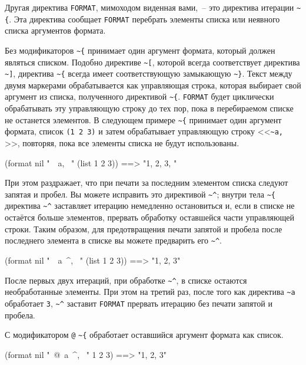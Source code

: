Другая директива \lstinline{FORMAT}, мимоходом виденная вами,~-- это директива итерации
\lstinline!~{!. Эта директива сообщает \lstinline{FORMAT} перебрать элементы списка или
  неявного списка аргументов формата.

Без модификаторов \lstinline!~{! принимает один аргумент формата, который должен являться списком. Подобно директиве
\lstinline!~[!, которой всегда соответствует директива \lstinline!~]!, директива \lstinline!~{! всегда имеет соответствующую замыкающую
\lstinline!~}!. Текст между двумя маркерами обрабатывается как управляющая строка, которая выбирает свой аргумент из
списка, полученного  директивой \lstinline!~{!. \lstinline{FORMAT} будет циклически обрабатывать эту
управляющую строку до тех пор, пока в перебираемом списке не останется элементов. В следующем примере \lstinline!~{!
принимает один аргумент формата, список \lstinline{(1 2 3)} и затем обрабатывает управляющую строку <<\lstinline!~a, !>>, повторяя,
пока все элементы списка не будут использованы.

\begin{myverb}
(format nil "~{~a, ~}" (list 1 2 3)) ==> "1, 2, 3, "
\end{myverb}

При этом раздражает, что при печати за последним элементом списка следуют запятая и пробел. Вы можете исправить
это директивой \lstinline!~^!; внутри тела \lstinline!~{! директива \lstinline!~^! заставляет итерацию немедленно остановиться и, если в
списке не остаётся больше элементов, прервать обработку оставшейся части управляющей строки. Таким образом, для
предотвращения печати запятой и пробела после последнего элемента в списке вы можете предварить его \lstinline!~^!.

\begin{myverb}
(format nil "~{~a~^, ~}" (list 1 2 3)) ==> "1, 2, 3"
\end{myverb}

После первых двух итераций, при обработке \lstinline!~^!, в списке остаются необработанные
элементы. При этом на третий раз, после того как директива \lstinline!~a! обработает
\lstinline{3}, \lstinline!~^! заставит \lstinline{FORMAT} прервать итерацию без печати запятой и
пробела.

С модификатором \lstinline!@! \lstinline!~{! обработает оставшийся аргумент формата как список.

\begin{myverb}
(format nil "~@{~a~^, ~}" 1 2 3) ==> "1, 2, 3"
\end{myverb}

